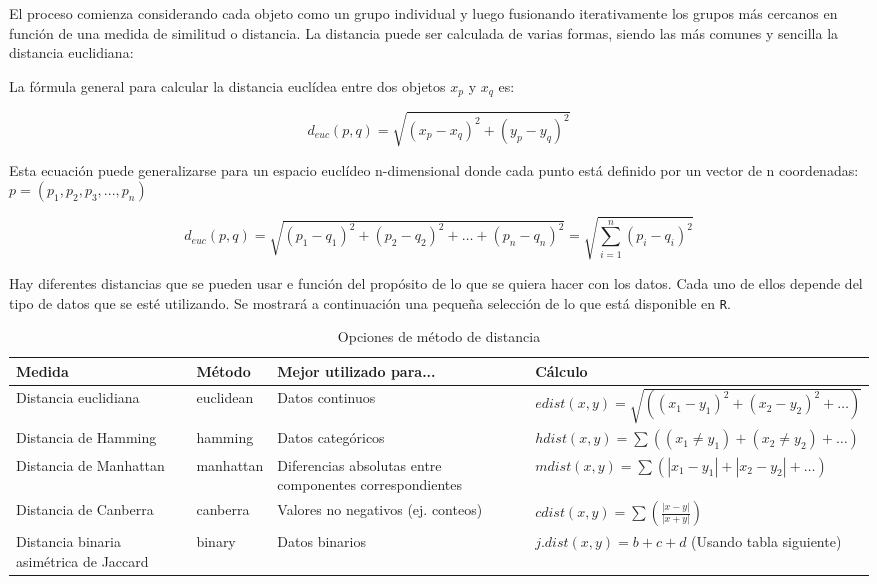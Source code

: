 El proceso comienza considerando cada objeto como un grupo individual y luego fusionando iterativamente los grupos más cercanos en función de una medida de similitud o distancia. La distancia puede ser calculada de varias formas, siendo las más comunes y sencilla la distancia euclidiana: 

La fórmula general para calcular la distancia euclídea entre dos objetos \(x_p \) y \(x_q\) es:

\[
d_{euc}(p,q) = \sqrt{(x_p - x_q)^2 + (y_p - y_q)^2}
\]

Esta ecuación puede generalizarse para un espacio euclídeo n-dimensional donde cada punto está definido por un vector de n coordenadas: $p = (p_1,p_2,p_3,...,p_n)$

\[
d_{euc}(p,q) = \sqrt{(p_1 - q_1)^2 + (p_2 - q_2)^2 + \ldots + (p_n - q_n)^2} = \sqrt{\sum_{i=1}^{n}(p_i - q_i)^2}
\]

Hay diferentes distancias que se pueden usar e función del propósito de lo que se quiera hacer con los datos. Cada uno de ellos depende del tipo de datos que se esté utilizando. Se mostrará a continuación una pequeña selección de lo que está disponible en \texttt{R}.
\begin{table}[H]
    \centering
    \caption{Opciones de método de distancia}
    \begin{tabular}{|p{3cm}|p{2.5cm}|p{4.5cm}|p{6cm}|}
    \hline
    \textbf{Medida} & \textbf{Método} & \textbf{Mejor utilizado para...} & \textbf{Cálculo} \\
    \hline
    Distancia euclidiana & euclidean & Datos continuos & \(edist(x, y) = \sqrt{((x_1 - y_1)^2 + (x_2 - y_2)^2 + \ldots)}\) \\
    \hline
    Distancia de Hamming & hamming & Datos categóricos & \(hdist(x, y) = \sum((x_1 \neq y_1) + (x_2 \neq y_2) + \ldots)\) \\
    \hline
    Distancia de Manhattan & manhattan & Diferencias absolutas entre componentes correspondientes & \(mdist(x, y) = \sum(|x_1 - y_1| + |x_2 - y_2| + \ldots)\) \\
    \hline
    Distancia de Canberra & canberra & Valores no negativos (ej. conteos) & \(cdist(x, y) = \sum\left(\frac{|x - y|}{|x + y|}\right)\) \\
    \hline
    Distancia binaria asimétrica de Jaccard & binary & Datos binarios & \(j.dist(x, y) = b + c + d\) (Usando tabla siguiente) \\
    \hline
    \end{tabular}
\end{table}

